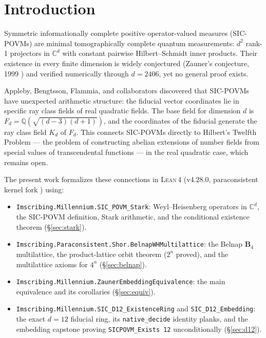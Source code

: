 \documentclass[12pt,a4paper]{article}
\newcommand{\BFour}{\mathbf{B}_4}
\newcommand{\Kd}{K_d}
\newcommand{\Lean}{\textsc{Lean\,4}}
\begin{document}
\tableofcontents
\newpage

\section{Introduction}
\label{sec:intro}

Symmetric informationally complete positive operator-valued measures
(SIC-POVMs) are minimal tomographically complete quantum measurements: $d^2$
rank-1 projectors in $\mathbb{C}^d$ with constant pairwise Hilbert--Schmidt
inner products.  Their existence in every finite dimension is widely
conjectured (Zauner's conjecture, 1999 \cite{Zauner1999}) and verified
numerically through $d = 2406$, yet no general proof exists.

Appleby, Bengtsson, Flammia, and collaborators \cite{Appleby2013,Appleby2017}
discovered that SIC-POVMs have unexpected arithmetic structure: the fiducial
vector coordinates lie in specific ray class fields of real quadratic fields.
The base field for dimension $d$ is $F_d = \mathbb{Q}(\sqrt{(d-3)(d+1)})$, and
the coordinates of the fiducial generate the ray class field $\Kd$ of $F_d$.
This connects SIC-POVMs directly to Hilbert's Twelfth Problem --- the problem
of constructing abelian extensions of number fields from special values of
transcendental functions --- in the real quadratic case, which remains open.

The present work formalizes these connections in \Lean{} \cite{Lean4}
(v4.28.0, paraconsistent kernel fork \cite{p4rakernel}) using:
\begin{itemize}
  \item \texttt{Imscribing.Millennium.SIC\_POVM\_Stark}: Weyl--Heisenberg
    operators in $\mathbb{C}^d$, the SIC-POVM definition, Stark arithmetic,
    and the conditional existence theorem (\S\ref{sec:stark}).
  \item \texttt{Imscribing.Paraconsistent.Shor.BelnapWHMultilattice}: the
    Belnap $\BFour$ multilattice, the product-lattice orbit theorem
    ($2^n$ proved), and the multilattice axioms for $4^n$ (\S\ref{sec:belnap}).
  \item \texttt{Imscribing.Millennium.ZaunerEmbeddingEquivalence}: the main
    equivalence and its corollaries (\S\ref{sec:equiv}).
  \item \texttt{Imscribing.Millennium.SIC\_D12\_ExistenceRing} and
    \texttt{SIC\_D12\_Embedding}: the exact $d = 12$ fiducial ring, its
    \texttt{native\_decide} identity planks, and the embedding capstone
    proving \texttt{SICPOVM\_Exists 12} unconditionally (\S\ref{sec:d12}).
\end{itemize}
\end{document}
